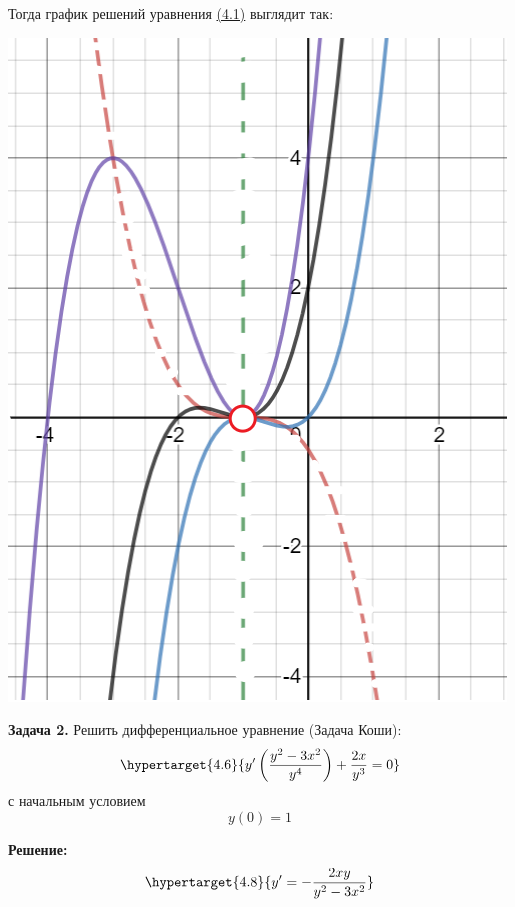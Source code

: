 \documentclass[10pt]{report}
\begin{document}
Тогда график решений уравнения \hyperlink{4.1}{(4.1)} выглядит так:
\begin{center}
{\includegraphics[scale=0.45]{graph4.4.png}} 
\end{center}

\vspace{15mm}
\textbf{Задача 2.} Решить дифференциальное уравнение (Задача Коши): 
\newline
\begin{equation}
\hypertarget{4.6}{y'\left(\frac {y^2-3x^2}{y^4} \right) +\frac {2x} {y^3} = 0}
\end{equation}
\newline
с начальным условием
\newline
\begin{equation}
y(0) = 1
\end{equation}

\textbf {Решение:}
\begin{equation}
\hypertarget{4.8}{ y' = -\frac {2xy}{y^2-3x^2}}
\end{equation}
\end{document}
